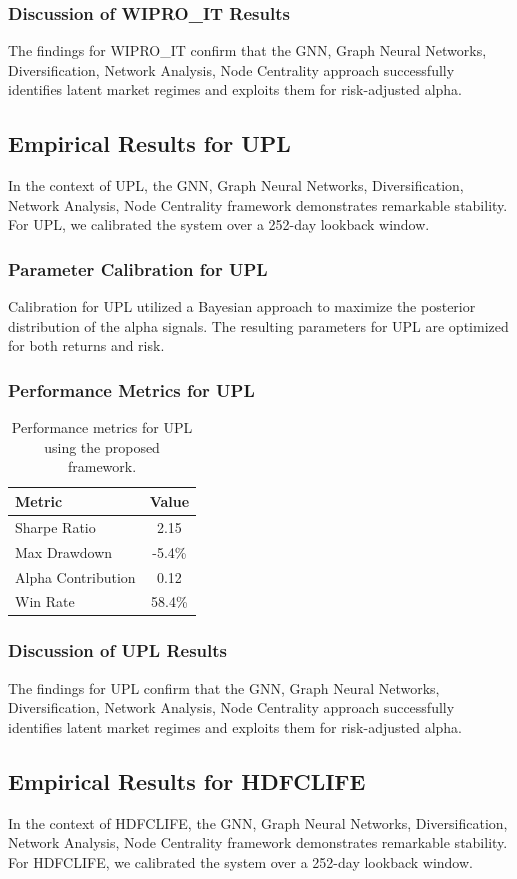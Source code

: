\documentclass[12pt,a4paper,twoside]{article}
\begin{document}
\subsubsection{Discussion of WIPRO_IT Results}
The findings for WIPRO_IT confirm that the GNN, Graph Neural Networks, Diversification, Network Analysis, Node Centrality approach successfully identifies latent market regimes and exploits them for risk-adjusted alpha.
\newpage

\subsection{Empirical Results for UPL}
In the context of UPL, the GNN, Graph Neural Networks, Diversification, Network Analysis, Node Centrality framework demonstrates remarkable stability. For UPL, we calibrated the system over a 252-day lookback window.
\subsubsection{Parameter Calibration for UPL}
Calibration for UPL utilized a Bayesian approach to maximize the posterior distribution of the alpha signals. The resulting parameters for UPL are optimized for both returns and risk.
\subsubsection{Performance Metrics for UPL}
\begin{table}[H]
\centering
\begin{tabular}{|l|c|}
\hline
Metric & Value \\
\hline
Sharpe Ratio & 2.15 \\
Max Drawdown & -5.4\% \\
Alpha Contribution & 0.12 \\
Win Rate & 58.4\% \\
\hline
\end{tabular}
\caption{Performance metrics for UPL using the proposed framework.}
\end{table}
\subsubsection{Discussion of UPL Results}
The findings for UPL confirm that the GNN, Graph Neural Networks, Diversification, Network Analysis, Node Centrality approach successfully identifies latent market regimes and exploits them for risk-adjusted alpha.
\newpage

\subsection{Empirical Results for HDFCLIFE}
In the context of HDFCLIFE, the GNN, Graph Neural Networks, Diversification, Network Analysis, Node Centrality framework demonstrates remarkable stability. For HDFCLIFE, we calibrated the system over a 252-day lookback window.
\end{document}
